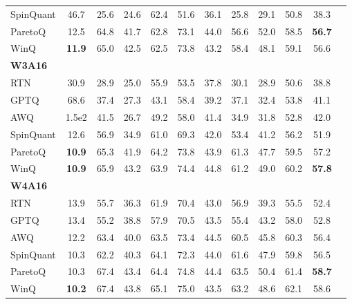 \documentclass{article}
\theoremstyle{definition}
\newcommand{\acronym}{{\sc WinQ}}
\begin{document}
\begin{table}[t!]
{\begin{tabular}{lc|cccccccccc}
    SpinQuant & 46.7 & 25.6 & 24.6 & 62.4 & 51.6 & 36.1 & 25.8 & 29.1 & 50.8 & 38.3 \\
    ParetoQ & 12.5 & 64.8 & 41.7 & 62.8 & 73.1 & 44.0 & 56.6 & 52.0 & 58.5 & \textbf{56.7} \\ \midrule
    \acronym{} & \textbf{11.9} & 65.0 & 42.5 & 62.5 & 73.8 & 43.2 & 58.4 & 48.1 & 59.1 & {56.6} \\ \midrule \midrule
    \textbf{W3A16} \\ \midrule
    RTN & 30.9 & 28.9& 25.0& 55.9& 53.5& 37.8& 30.1& 28.9& 50.6& 38.8 \\ 
    GPTQ & 68.6 & 37.4 & 27.3 & 43.1 & 58.4 & 39.2 & 37.1 & 32.4 & 53.8 & 41.1  \\
    AWQ & 1.5e2 & 41.5 & 26.7 & 49.2 & 58.0 & 41.4 & 34.9 & 31.8 & 52.8 & 42.0  \\
    SpinQuant & 12.6 & 56.9 & 34.9 & 61.0 & 69.3 & 42.0 & 53.4 & 41.2 & 56.2 & 51.9  \\
    ParetoQ & \textbf{10.9} & 65.3 & 41.9 & 64.2 & 73.8 & 43.9 & 61.3 & 47.7 & 59.5 & 57.2 \\ \midrule
    \acronym{} & \textbf{10.9} & 65.9 & 43.2 & 63.9 & 74.4 & 44.8 & 61.2 & 49.0 & 60.2 & \textbf{57.8}	 \\ \midrule \midrule
    \textbf{W4A16} \\ \midrule
    RTN & 13.9 & 55.7 & 36.3 & 61.9 & 70.4 & 43.0 & 56.9 & 39.3 & 55.5 & 52.4  \\ 
    GPTQ & 13.4 & 55.2 & 38.8 & 57.9 & 70.5 & 43.5 & 55.4 & 43.2 & 58.0 & 52.8 \\
    AWQ & 12.2 & 63.4 & 40.0 & 63.5 & 73.4 & 44.5 & 60.5 & 45.8 & 60.3 & 56.4   \\
    SpinQuant & 10.3 & 62.2 & 40.3 & 64.1 & 72.3 & 44.0 & 61.6 & 47.9 & 59.8 & 56.5   \\
    ParetoQ & 10.3 & 67.4 & 43.4 & 64.4 & 74.8 & 44.4 & 63.5 & 50.4 & 61.4 & \textbf{58.7}  \\ \midrule
    \acronym{} & \textbf{10.2} & 67.4 & 43.8 & 65.1 & 75.0 & 43.5 & 63.2 & 48.6 & 62.1 & 58.6	 \\
    \bottomrule
  \end{tabular}
  }
\end{table}
\end{document}
